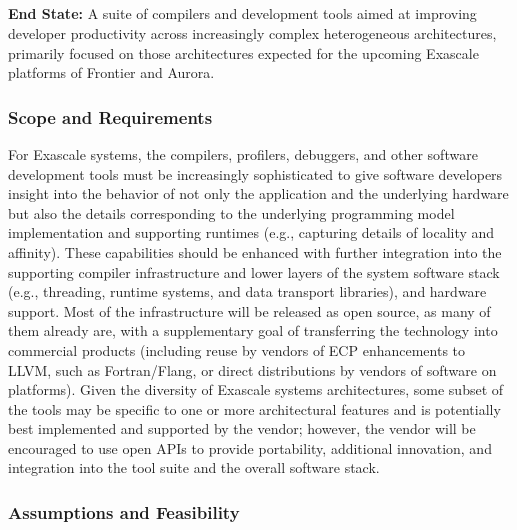 \subsection{ \tools}\label{subsect:tools}

\textbf{End State:}	A suite of compilers and development tools aimed at improving developer productivity across increasingly complex heterogeneous architectures, primarily focused on those architectures expected for the upcoming Exascale platforms of Frontier and Aurora.

\subsubsection{Scope and Requirements}

For Exascale systems, the compilers, profilers, debuggers, and other software development tools must be increasingly sophisticated to give software developers insight into the behavior of not only the application and the underlying hardware but also the details corresponding to the underlying programming model implementation and supporting runtimes (e.g., capturing details of locality and affinity). These capabilities should be enhanced with further integration into the supporting compiler infrastructure and lower layers of the system software stack (e.g., threading, runtime systems, and data transport libraries), and hardware support. Most of the infrastructure will be released as open source, as many of them already are, with a supplementary goal of transferring the technology into commercial products (including reuse by vendors of ECP enhancements to LLVM, such as Fortran/Flang, or direct distributions by vendors of software on platforms). Given the diversity of Exascale systems architectures, some subset of the tools may be specific to one or more architectural features and is potentially best implemented and supported by the vendor; however, the vendor will be encouraged to use open APIs to provide portability, additional innovation, and integration into the tool suite and the overall software stack.

\subsubsection{Assumptions and Feasibility }

